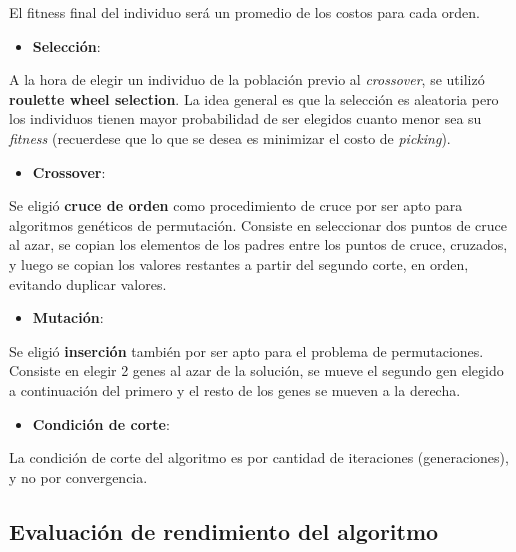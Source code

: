 \documentclass[
]{article}
\providecommand{\tightlist}{%
  \setlength{\itemsep}{0pt}\setlength{\parskip}{0pt}}
\begin{document}
El fitness final del individuo será un promedio de los costos para cada
orden.

\begin{itemize}
\tightlist
\item
  \textbf{Selección}:
\end{itemize}

A la hora de elegir un individuo de la población previo al
\emph{crossover}, se utilizó \textbf{roulette wheel selection}. La idea
general es que la selección es aleatoria pero los individuos tienen
mayor probabilidad de ser elegidos cuanto menor sea su \emph{fitness}
(recuerdese que lo que se desea es minimizar el costo de
\emph{picking}).

\begin{itemize}
\tightlist
\item
  \textbf{Crossover}:
\end{itemize}

Se eligió \textbf{cruce de orden} como procedimiento de cruce por ser
apto para algoritmos genéticos de permutación. Consiste en seleccionar
dos puntos de cruce al azar, se copian los elementos de los padres entre
los puntos de cruce, cruzados, y luego se copian los valores restantes a
partir del segundo corte, en orden, evitando duplicar valores.

\begin{itemize}
\tightlist
\item
  \textbf{Mutación}:
\end{itemize}

Se eligió \textbf{inserción} también por ser apto para el problema de
permutaciones. Consiste en elegir 2 genes al azar de la solución, se
mueve el segundo gen elegido a continuación del primero y el resto de
los genes se mueven a la derecha.

\begin{itemize}
\tightlist
\item
  \textbf{Condición de corte}:
\end{itemize}

La condición de corte del algoritmo es por cantidad de iteraciones
(generaciones), y no por convergencia.

\hypertarget{evaluaciuxf3n-de-rendimiento-del-algoritmo}{%
\subsection{Evaluación de rendimiento del
algoritmo}\label{evaluaciuxf3n-de-rendimiento-del-algoritmo}}
\end{document}
